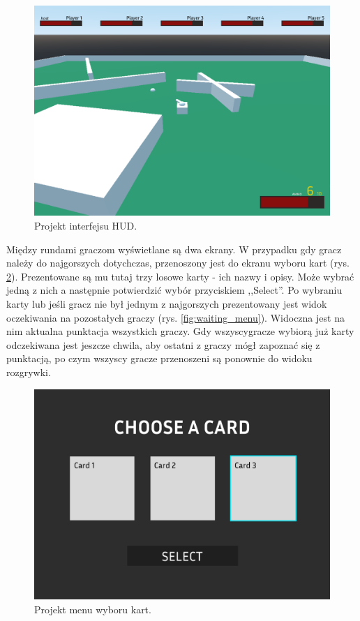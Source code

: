 \begin{figure}
    \centering
    \includegraphics[width=.8\linewidth]{Images/design/Game View.png}
    \caption{Projekt interfejsu HUD.}
    \label{fig:game_view}
\end{figure}
\newpage
Między rundami graczom wyświetlane są dwa ekrany. W przypadku gdy gracz należy do najgorszych dotychczas, przenoszony jest do ekranu wyboru kart (rys. \ref{fig:cards_menu}). Prezentowane są mu tutaj trzy losowe karty - ich nazwy i opisy. Może wybrać jedną z nich a następnie potwierdzić wybór przyciskiem ,,Select''. Po wybraniu karty lub jeśli gracz nie był jednym z najgorszych prezentowany jest widok oczekiwania na pozostałych graczy (rys. \ref{fig:waiting_menu}). Widoczna jest na nim aktualna punktacja wszystkich graczy. Gdy wszyscygracze wybiorą już karty odczekiwana jest jeszcze chwila, aby ostatni z graczy mógł zapoznać się z punktacją, po czym wszyscy gracze przenoszeni są ponownie do widoku rozgrywki.

\begin{figure}
    \centering
    \includegraphics[width=.8\linewidth]{Images/design/Cards Menu.png}
    \caption{Projekt menu wyboru kart.}
    \label{fig:cards_menu}
\end{figure}

